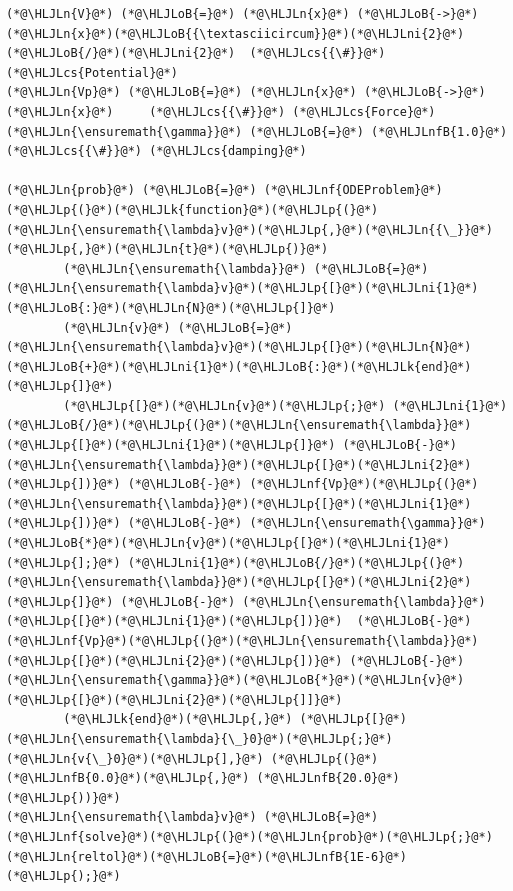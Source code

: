 \documentclass[12pt,a4paper]{article}
\newcommand{\HLJLk}[1]{\textcolor[RGB]{148,91,176}{\textbf{#1}}}
\newcommand{\HLJLn}[1]{#1}
\newcommand{\HLJLnf}[1]{\textcolor[RGB]{66,102,213}{#1}}
\newcommand{\HLJLnfB}[1]{\textcolor[RGB]{59,151,46}{#1}}
\newcommand{\HLJLni}[1]{\textcolor[RGB]{59,151,46}{#1}}
\newcommand{\HLJLoB}[1]{\textcolor[RGB]{102,102,102}{\textbf{#1}}}
\newcommand{\HLJLp}[1]{#1}
\newcommand{\HLJLcs}[1]{\textcolor[RGB]{153,153,119}{\textit{#1}}}
\begin{document}
\begin{lstlisting}
(*@\HLJLn{V}@*) (*@\HLJLoB{=}@*) (*@\HLJLn{x}@*) (*@\HLJLoB{->}@*) (*@\HLJLn{x}@*)(*@\HLJLoB{{\textasciicircum}}@*)(*@\HLJLni{2}@*)(*@\HLJLoB{/}@*)(*@\HLJLni{2}@*)  (*@\HLJLcs{{\#}}@*) (*@\HLJLcs{Potential}@*)
(*@\HLJLn{Vp}@*) (*@\HLJLoB{=}@*) (*@\HLJLn{x}@*) (*@\HLJLoB{->}@*) (*@\HLJLn{x}@*)     (*@\HLJLcs{{\#}}@*) (*@\HLJLcs{Force}@*)
(*@\HLJLn{\ensuremath{\gamma}}@*) (*@\HLJLoB{=}@*) (*@\HLJLnfB{1.0}@*)    (*@\HLJLcs{{\#}}@*) (*@\HLJLcs{damping}@*)

(*@\HLJLn{prob}@*) (*@\HLJLoB{=}@*) (*@\HLJLnf{ODEProblem}@*)(*@\HLJLp{(}@*)(*@\HLJLk{function}@*)(*@\HLJLp{(}@*)(*@\HLJLn{\ensuremath{\lambda}v}@*)(*@\HLJLp{,}@*)(*@\HLJLn{{\_}}@*)(*@\HLJLp{,}@*)(*@\HLJLn{t}@*)(*@\HLJLp{)}@*) 
        (*@\HLJLn{\ensuremath{\lambda}}@*) (*@\HLJLoB{=}@*) (*@\HLJLn{\ensuremath{\lambda}v}@*)(*@\HLJLp{[}@*)(*@\HLJLni{1}@*)(*@\HLJLoB{:}@*)(*@\HLJLn{N}@*)(*@\HLJLp{]}@*)
        (*@\HLJLn{v}@*) (*@\HLJLoB{=}@*) (*@\HLJLn{\ensuremath{\lambda}v}@*)(*@\HLJLp{[}@*)(*@\HLJLn{N}@*)(*@\HLJLoB{+}@*)(*@\HLJLni{1}@*)(*@\HLJLoB{:}@*)(*@\HLJLk{end}@*)(*@\HLJLp{]}@*)
        (*@\HLJLp{[}@*)(*@\HLJLn{v}@*)(*@\HLJLp{;}@*) (*@\HLJLni{1}@*)(*@\HLJLoB{/}@*)(*@\HLJLp{(}@*)(*@\HLJLn{\ensuremath{\lambda}}@*)(*@\HLJLp{[}@*)(*@\HLJLni{1}@*)(*@\HLJLp{]}@*) (*@\HLJLoB{-}@*) (*@\HLJLn{\ensuremath{\lambda}}@*)(*@\HLJLp{[}@*)(*@\HLJLni{2}@*)(*@\HLJLp{])}@*) (*@\HLJLoB{-}@*) (*@\HLJLnf{Vp}@*)(*@\HLJLp{(}@*)(*@\HLJLn{\ensuremath{\lambda}}@*)(*@\HLJLp{[}@*)(*@\HLJLni{1}@*)(*@\HLJLp{])}@*) (*@\HLJLoB{-}@*) (*@\HLJLn{\ensuremath{\gamma}}@*)(*@\HLJLoB{*}@*)(*@\HLJLn{v}@*)(*@\HLJLp{[}@*)(*@\HLJLni{1}@*)(*@\HLJLp{];}@*) (*@\HLJLni{1}@*)(*@\HLJLoB{/}@*)(*@\HLJLp{(}@*)(*@\HLJLn{\ensuremath{\lambda}}@*)(*@\HLJLp{[}@*)(*@\HLJLni{2}@*)(*@\HLJLp{]}@*) (*@\HLJLoB{-}@*) (*@\HLJLn{\ensuremath{\lambda}}@*)(*@\HLJLp{[}@*)(*@\HLJLni{1}@*)(*@\HLJLp{])}@*)  (*@\HLJLoB{-}@*) (*@\HLJLnf{Vp}@*)(*@\HLJLp{(}@*)(*@\HLJLn{\ensuremath{\lambda}}@*)(*@\HLJLp{[}@*)(*@\HLJLni{2}@*)(*@\HLJLp{])}@*) (*@\HLJLoB{-}@*) (*@\HLJLn{\ensuremath{\gamma}}@*)(*@\HLJLoB{*}@*)(*@\HLJLn{v}@*)(*@\HLJLp{[}@*)(*@\HLJLni{2}@*)(*@\HLJLp{]]}@*)
        (*@\HLJLk{end}@*)(*@\HLJLp{,}@*) (*@\HLJLp{[}@*)(*@\HLJLn{\ensuremath{\lambda}{\_}0}@*)(*@\HLJLp{;}@*) (*@\HLJLn{v{\_}0}@*)(*@\HLJLp{],}@*) (*@\HLJLp{(}@*)(*@\HLJLnfB{0.0}@*)(*@\HLJLp{,}@*) (*@\HLJLnfB{20.0}@*)(*@\HLJLp{))}@*)
(*@\HLJLn{\ensuremath{\lambda}v}@*) (*@\HLJLoB{=}@*) (*@\HLJLnf{solve}@*)(*@\HLJLp{(}@*)(*@\HLJLn{prob}@*)(*@\HLJLp{;}@*) (*@\HLJLn{reltol}@*)(*@\HLJLoB{=}@*)(*@\HLJLnfB{1E-6}@*)(*@\HLJLp{);}@*)


\end{lstlisting}
\end{document}
